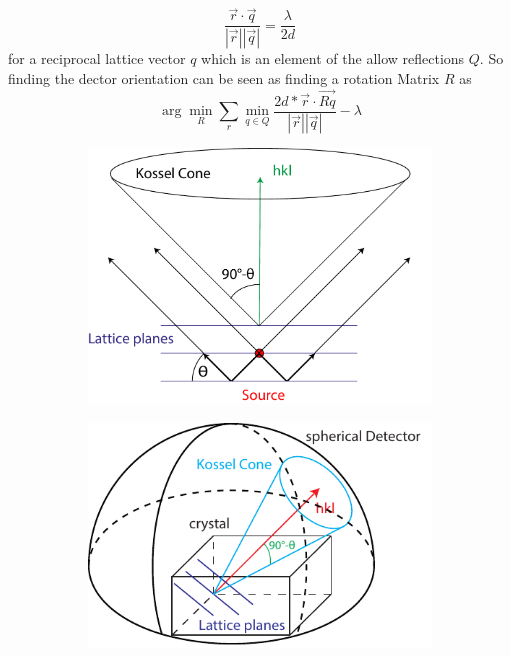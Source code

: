 \begin{equation}
\frac{\vec{r} \cdot \vec{q}}{\left|\vec{r}\right| \left| \vec{q}\right|} = \frac{\lambda}{2d}
\end{equation}
 for a reciprocal lattice vector $q$ which is an element of the allow reflections $Q$. So finding the dector orientation can be seen as finding a rotation Matrix $R$ as
\begin{equation}
\arg\!\min_{R} \sum_{r} \min_{q\in Q} \frac{2 d * \vec{r} \cdot \vec{Rq}}{\left|\vec{r}\right| \left| \vec{q}\right|} -\lambda
\end{equation}
\begin{figure}
	\centering
	\begin{subfigure}[b]{0.25\textwidth}
	\includegraphics[width=\linewidth]{images/kossel0.pdf}
	\end{subfigure}
	\begin{subfigure}[b]{0.25\textwidth}
	\includegraphics[width=\linewidth]{images/kossel.pdf}

\end{subfigure}
\end{figure}

